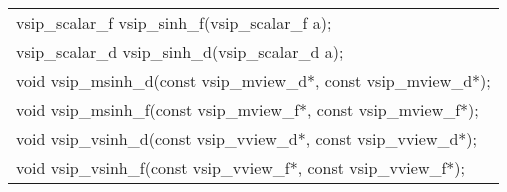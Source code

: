 \\\cvsiplh
\afh
\\\hspace*{.04\textwidth} {
\ttfamily
\begin{tabular}[H]{l}
vsip\_scalar\_f vsip\_sinh\_f(vsip\_scalar\_f a);\\
vsip\_scalar\_d vsip\_sinh\_d(vsip\_scalar\_d a);\\
void vsip\_msinh\_d(const vsip\_mview\_d*, const vsip\_mview\_d*);\\
void vsip\_msinh\_f(const vsip\_mview\_f*, const vsip\_mview\_f*);\\
void vsip\_vsinh\_d(const vsip\_vview\_d*, const vsip\_vview\_d*);\\
void vsip\_vsinh\_f(const vsip\_vview\_f*, const vsip\_vview\_f*);\\
\end{tabular}
}
\\\pyjvsiph
{}
